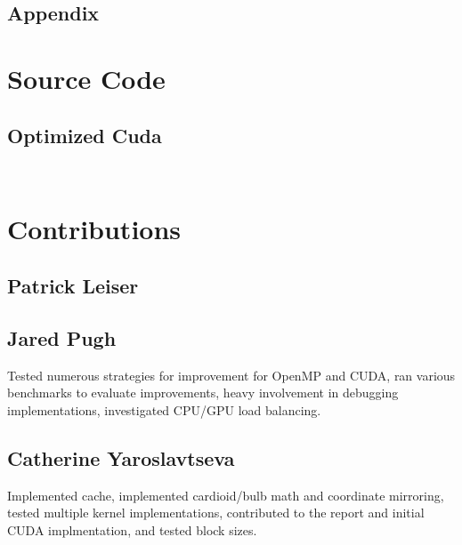 \documentclass{article}
\begin{document}
\pagebreak

\begin{center}

\section*{Appendix}

\end{center}

\appendix

\section{Source Code}

\subsection{Optimized Cuda}

\begin{lstlisting}[language=C]
    
\end{lstlisting}

\section{Contributions}

\subsection{Patrick Leiser}

\subsection{Jared Pugh}
Tested numerous strategies for improvement for OpenMP and CUDA, ran various benchmarks to evaluate improvements, heavy involvement in debugging implementations, investigated CPU/GPU load balancing.

\subsection{Catherine Yaroslavtseva}
Implemented cache, implemented cardioid/bulb math and coordinate mirroring, tested multiple kernel implementations, contributed to the report and initial CUDA implmentation, and tested block sizes.
\end{document}
